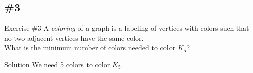 \documentclass{beamer}
\begin{document}
\subsection{\#3}
\begin{frame}{Exercise \#3}
  A \emph{coloring} of a graph is a labeling of vertices with colors such that
  no two adjacent vertices have the same color. \pause \\[.5em]
  What is the minimum number of colors needed to color $K_5$? \pause
  \begin{block}{Solution}
    We need 5 colors to color $K_5$.
  \end{block}
\end{frame}
\end{document}
